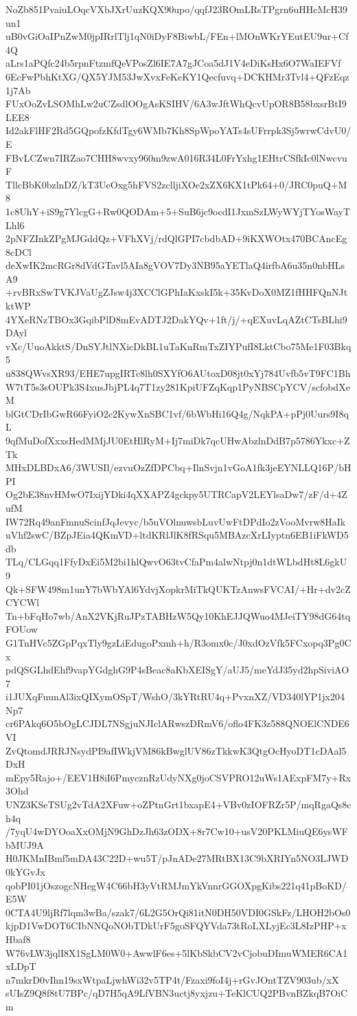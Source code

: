 NoZb851PvaiuLOqcVXbJXrUuzKQX90upo/qqfJ23ROmLRsTPgrn6uHHcMcH39un1
uB0vGiOaIPnZwM0jpIRrlTlj1qN0iDyF8BiwbL/FEn+lMOnWKrYEutEU9ur+Cf4Q
aLrs1aPQfc24b5rpnFtzmfQeVPosZl6IE7A7gJCoa5dJ1V4eDiKsHx6O7WaIEFVf
6EcFwPbhKtXG/QX5YJM53JwXvxFeKeKY1Qecfuvq+DCKHMr3Tvl4+QFzEqz1j7Ab
FUxOoZvLSOMhLw2uCZsdlOOgAsKSIHV/6A3wJftWhQcvUpOR8B58bxsrBtI9LEE8
Id2akFlHF2Rd5GQpofzKfdTgy6WMb7Kh8SpWpoYATs4sUFrrpk3Sj5wrwCdvU0/E
FBvLCZwn7IRZao7CHH8wvxy960m9zwA016R34L0FrYxhg1EHtrCSfkIc0lNwcvuF
TllcBbK0bzlnDZ/kT3UeOxg5hFVS2zclljiXOe2xZX6KX1tPk64+0/JRC0puQ+M8
1c8UhY+iS9g7YlcgG+Rw0QODAm+5+SuB6jc9ocdI1JxmSzLWyWYjTYosWayTLhl6
2pNFZInkZPgMJGddQz+VFhXVj/rdQlGPI7cbdbAD+9iKXWOtx470BCAncEg8cDCl
deXwIK2mcRGr8dVdGTavl5AIa8gVOV7Dy3NB95aYETlaQ4irfbA6u35n0nbHLsA9
+rvBRxSwTVKJVaUgZJsw4j3XCClGPhIaKxskI5k+35KvDoX0MZ1fHHFQnNJtktWP
4YXeRNzTBOx3GqibPlD8mEvADTJ2DakYQv+1ft/j/+qEXuvLqAZtCTsBLhi9DAyl
vXc/UuoAkktS/DnSYJtlNXicDkBL1uTaKnRmTxZIYPufI8LktCbo75Me1F03Bkq5
u838QWvsXR93/EHE7upgIRTc8lh0SXYfO6AUtoxD08jt0xYj784Uvfb5vT9FC1Bh
W7tT5s3sOUPk3S4xusJbjPL4q7T1zy281KpiUFZqKqp1PyNBSCpYCV/scfobdXeM
blGtCDrIbGwR66FyiO2c2KywXnSBC1vf/6bWbHi16Q4g/NqkPA+pPj0Uurs9I8qL
9qfMuDofXxxsHedMMjJU0EtHlRyM+Ij7miDk7qcUHwAbzlnDdB7p5786Ykxc+ZTk
MHxDLBDxA6/3WUSIl/ezvuOzZfDPCbq+IlnSvjn1vGoA1fk3jeEYNLLQ16P/bHPI
Og2bE38nvHMwO7IxijYDki4qXXAPZ4gckpy5UTRCapV2LEYlsaDw7/zF/d+4ZufM
IW72Rq49anFmnuScinfJqJevyc/b5uVOlnuwsbLuvUwFtDPdIo2zVooMvrw8HaIk
uVhf2swC/BZpJEia4QKmVD+ltdKRlJlK8fRSqu5MBAzcXrLIyptn6EB1iFkWD5db
TLq/CLGqq1FfyDxEi5M2bi1hlQwvO63tvCfaPm4alwNtpj0n1dtWLbdHt8L6gkU9
Qk+SFW498m1unY7bWbYAl6YdvjXopkrMiTkQUKTzAnwsFVCAI/+Hr+dv2cZCYCWl
Tn+bFqHo7wb/AnX2VKjRuJPzTABHzW5Qy10KhEJJQWuo4MJeiTY98dG64tqFOUow
G1TnHVc5ZGpPqxTly9gzLiEdugoPxmh+h/R3omx0c/J0xdOzVfk5FCxopq3Pg0Cx
pdQSGLhdEhf9vapYGdghG9P4sBeac8aKbXEISgY/aUJ5/meYdJ35yd2hpSiviAO7
i1JUXqFuunAl3ixQIXymOSpT/WshO/3kYRtRU4q+PvxnXZ/VD340lYP1jx204Np7
cr6PAkq6O5bOgLCJDL7NSgjuNJIclARwszDRmV6/oflo4FK3z588QNOElCNDE6VI
ZvQtomdJRRJNsydPI9afIWkjVM86kBwglUV86zTkkwK3QtgOcHyoDT1cDAal5DxH
mEpy5Rajo+/EEV1H8iI6PmycznRzUdyNXg0joCSVPRO12uWs1AExpFM7y+Rx3Ohd
UNZ3KSeTSUg2vTdA2XFuw+oZPtnGrt1bxapE4+VBv0zIOFRZr5P/mqRgaQs8ch4q
/7yqU4wDYOoaXxOMjN9GhDzJh63zODX+8r7Cw10+usV20PKLMiuQE6ysWFbMUJ9A
H0JKMnIBmf5mDA43C22D+wu5T/pJnADe27MRtBX13C9bXRIYn5NO3LJWD0kYGvJx
qobPI01jOszogcNHegW4C66bH3yVtRMJmYkVnnrGGOXpgKibs221q41pBoKD/E5W
0CTA4U9ljRf7lqm3wBa/szak7/6L2G5OrQi81itN0DH50VDI0GSkFz/LHOH2bOs0
kjpD1VwDOT6CIbNNQoNObTDkUrF5goSFQYVda73tRoLXLyjEc3L8IzPHP+xHbaf8
W76vLW3jqlI8X1SgLM0W0+AwwlF6es+5lKbSkbCV2vCjobuDImuWMER6CA1xLDpT
n7mkrD0vIhn19sxWtpaLjwhWi32v5TP4t/Fzaxi9foI4j+rGvJOntTZV903ub/xX
sUIsZ9Q8f8tU7BPc/qD7H5qA9LfVBN3uctj8yxjzu+TeKlCUQ2PBvnBZkqB7OiCm
